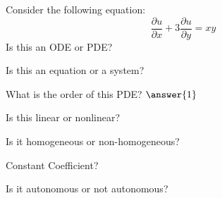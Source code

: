 \documentclass{ximera}
\begin{document}


\begin{exercise}
    Consider the following equation:  
    \[
        \displaystyle \frac{\partial u}{\partial x} + 3 \frac{\partial u}{\partial y} = xy
    \]
    Is this an ODE or PDE?
    \begin{multipleChoice}
    \end{multipleChoice}
    \begin{problem}
        Is this an equation or a system?
        \begin{multipleChoice}
        \end{multipleChoice}
        
        \begin{problem}
            What is the order of this PDE? $\answer{1}$
            
            \begin{problem}
                Is this linear or nonlinear?
                \begin{multipleChoice}
                \end{multipleChoice}
                
                \begin{problem}
                    Is it homogeneous or non-homogeneous?
                    \begin{multipleChoice}
                    \end{multipleChoice}
                    
                    \begin{problem}
                        Constant Coefficient?
                        \begin{multipleChoice}
                        \end{multipleChoice}
                    \end{problem}
                \end{problem}
            \end{problem}
        \end{problem}
    \end{problem}
    \begin{problem}
        Is it autonomous or not autonomous?
        \begin{multipleChoice}
        \end{multipleChoice}
    \end{problem}
\end{exercise}
\end{document}
